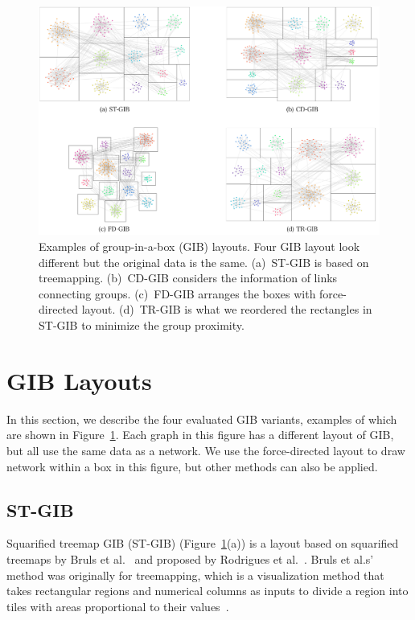 \documentclass[review]{vgtc}                 %
\begin{document}
\begin{figure}[t]
  \begin{center}
    \includegraphics[width=1\textwidth]{pictures/examples.png}
    \caption{Examples of group-in-a-box (GIB) layouts. Four GIB layout look different but the original data is the same. (a)~ST-GIB is based on treemapping. (b)~CD-GIB considers the information of links connecting groups. (c)~FD-GIB arranges the boxes with force-directed layout. (d)~TR-GIB is what we reordered the rectangles in ST-GIB to minimize the group proximity.}
    \label{GIB-examples}
  \end{center}
\end{figure}

\section{GIB Layouts}
In this section, we describe the four evaluated GIB variants,  examples of which are shown in Figure~\ref{GIB-examples}.
Each graph in this figure has a different layout of GIB, but all use the same data as a network.
We use the force-directed layout to draw network within a box in this figure, but other methods can also be applied.

\subsection{ST-GIB}
Squarified treemap GIB (ST-GIB) (Figure~\ref{GIB-examples}(a)) is a layout based on squarified treemaps by Bruls et al.~\cite{bruls2000squarified} and proposed by Rodrigues et al.~\cite{rodrigues2011group}.
Bruls et al.s' method was originally for treemapping, which is a visualization method that takes rectangular regions and numerical columns as inputs to divide a region into tiles with areas proportional to their values~\cite{shneiderman1992tree}.
\end{document}
